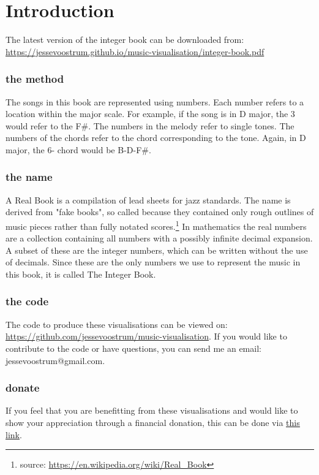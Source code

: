 \section*{Introduction}

\sffamily

The latest version of the integer book can be downloaded from: \url{https://jessevoostrum.github.io/music-visualisation/integer-book.pdf}

\subsubsection*{the method}
The songs in this book are represented using numbers. Each number refers to a location within the major scale. For example, if the song is in D major, the 3 would refer to the F\#. The numbers in the melody refer to single tones. The numbers of the chords refer to the chord corresponding to the tone. Again, in D major, the 6- chord would be B-D-F\#.  

\subsubsection*{the name}
A Real Book is a compilation of lead sheets for jazz standards. The name is derived from "fake books", so called because they contained only rough outlines of music pieces rather than fully notated scores.\footnote{source: \url{https://en.wikipedia.org/wiki/Real_Book}} In mathematics the real numbers are a collection containing all numbers with a possibly infinite decimal expansion. A subset of these are the integer numbers, which can be written without the use of decimals. Since these are the only numbers we use to represent the music in this book, it is called The Integer Book.

\subsubsection*{the code}
The code to produce these visualisations can be viewed on: \url{https://github.com/jessevoostrum/music-visualisation}. If you would like to contribute to the code or have questions, you can send me an email: jessevoostrum@gmail.com.

\subsubsection*{donate}
If you feel that you are benefitting from these visualisations and would like to show your appreciation through a financial donation, this can be done via \href{https://www.paypal.com/cgi-bin/webscr?cmd=_donations&business=jessevoostrum@gmail.com&no_shipping=1&no_note=1&tax=0&currency_code=EUR&lc=US&bn=PP_DonationsBF}{\underline{this link}}. 